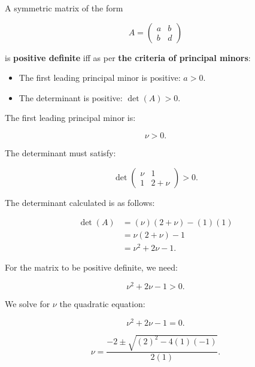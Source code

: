 \documentclass{article}
\begin{document}
A symmetric matrix of the form

\begin{equation}
A =
\begin{pmatrix}
a & b \\
b & d
\end{pmatrix}
\end{equation}

is \textbf{positive definite} iff as per \textbf{the criteria of principal minors}:

\begin{itemize}
    \item The first leading principal minor is positive: \( a > 0 \).
    \item The determinant is positive: \( \det(A) > 0 \).
\end{itemize}

The first leading principal minor is:

\begin{equation}
\nu > 0.
\end{equation}

The determinant must satisfy:

\begin{equation}
\det 
\begin{pmatrix}
\nu & 1 \\
1 & 2 + \nu
\end{pmatrix} > 0.
\end{equation}

The determinant calculated is as follows:

\begin{align*}
\det(A) &= (\nu)(2 + \nu) - (1)(1) \\
&= \nu(2 + \nu) - 1 \\
&= \nu^2 + 2\nu - 1.
\end{align*}

For the matrix to be positive definite, we need:

\begin{equation}
\nu^2 + 2\nu - 1 > 0.
\end{equation}
 
We solve for \( \nu \)  the quadratic equation:

\begin{equation}
\nu^2 + 2\nu - 1 = 0.
\end{equation}

\begin{equation}
\nu = \frac{-2 \pm \sqrt{(2)^2 - 4(1)(-1)}}{2(1)}.
\end{equation}
\end{document}
